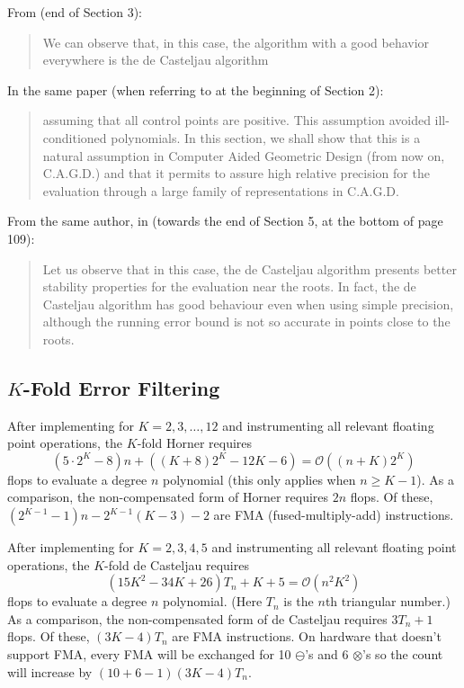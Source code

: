 \documentclass[letterpaper,10pt]{article}
\begin{document}
From \cite{Delgado2015} (end of Section 3):

\begin{quote}
  We can observe that, in this case, the algorithm with a good
  behavior everywhere is the de Casteljau algorithm
\end{quote}

\noindent In the same paper (when referring to \cite{Bezerra2013} at the
beginning of Section 2):

\begin{quote}
  assuming that all control points are positive. This assumption avoided
  ill-conditioned polynomials. In this section, we shall show that this is
  a natural assumption in Computer Aided Geometric Design (from now on,
  C.A.G.D.) and that it permits to assure high relative precision for the
  evaluation through a large family of representations in C.A.G.D.
\end{quote}

\noindent From the same author, in \cite{Mainar2005} (towards the
end of Section 5, at the bottom of page 109):

\begin{quote}
  Let us observe that in this case, the de Casteljau algorithm presents
  better stability properties for the evaluation near the roots. In fact,
  the de Casteljau algorithm has good behaviour even when using simple
  precision, although the running error bound is not so accurate in points
  close to the roots.
\end{quote}

\subsection{\texorpdfstring{\(K\)}{K}-Fold Error Filtering}

After implementing for \(K = 2, 3, \ldots, 12\) and instrumenting all
relevant floating point operations, the \(K\)-fold Horner requires
\[(5 \cdot 2^K - 8)n + \left((K + 8) 2^K - 12K - 6\right) =
\mathcal{O}\left((n + K)2^K\right)\]
flops to evaluate a degree \(n\) polynomial (this only applies when
\(n \geq K - 1\)). As a comparison, the
non-compensated form of Horner requires \(2n\) flops. Of these,
\(\left(2^{K - 1} - 1\right)n - 2^{K - 1}(K - 3) - 2\) are
FMA (fused-multiply-add) instructions.

After implementing for \(K = 2, 3, 4, 5\) and instrumenting all relevant
floating point operations, the \(K\)-fold de Casteljau requires
\[(15K^2 - 34K + 26)T_n + K + 5 =
\mathcal{O}\left(n^2 K^2\right)\]
flops to evaluate a degree \(n\) polynomial. (Here \(T_n\) is the
\(n\)th triangular number.) As a comparison, the non-compensated form of
de Casteljau requires \(3 T_n + 1\) flops. Of these, \((3K - 4)T_n\) are
FMA instructions. On hardware that doesn't support FMA,
every FMA will be exchanged for 10 \(\ominus\)'s and 6 \(\otimes\)'s so the
count will increase by \((10 + 6 - 1)(3K - 4)T_n\).
\end{document}
